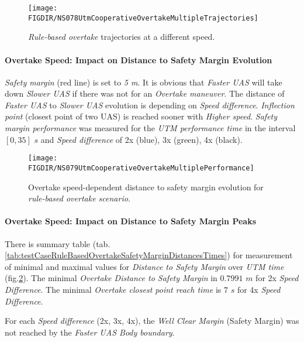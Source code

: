     \begin{figure}[H]
        \centering
        \texttt{[image: \\FIGDIR/NS078UtmCooperativeOvertakeMultipleTrajectories]}
        \caption{\emph{Rule-based overtake} trajectories at a different speed.}
        \label{fig:testCaseRuleBasedOvertakeDifferentSpeedTrajectoriesPerformance}
    \end{figure}
    \paragraph{Overtake Speed: Impact on Distance to Safety Margin Evolution} \emph{Safety margin} (red line) is set to \emph{5 m}. It is obvious that \emph{Faster UAS} will take down \emph{Slower UAS} if there was not for an \emph{Overtake maneuver}.  The distance of \emph{Faster UAS} to \emph{Slower UAS} evolution is depending on \emph{Speed difference}. \emph{Inflection point} (closest point of two UAS) is reached sooner with \emph{Higher speed}. \emph{Safety margin performance} was measured for the \emph{UTM performance time} in the interval $[0,35]$ $s$ and \emph{Speed difference} of 2x (blue), 3x (green), 4x (black).
    
    \begin{figure}[H]
        \centering
        \texttt{[image: \\FIGDIR/NS079UtmCooperativeOvertakeMultiplePerformance]}
        \caption{Overtake speed-dependent distance to safety margin evolution for \emph{rule-based overtake scenario}.}
        \label{fig:testRuleBasedOvertakeSafetyMarginForDifferentSpeedPerformance}
    \end{figure}
    
    \paragraph{Overtake Speed: Impact on Distance to Safety Margin Peaks} There is summary table (tab. \ref{tab:testCaseRuleBasedOvertakeSafetyMarginDistancesTimes}) for  measurement of minimal and maximal values for \emph{Distance to Safety Margin} over \emph{UTM time} (fig.\ref{fig:testRuleBasedOvertakeSafetyMarginForDifferentSpeedPerformance}). The minimal \emph{Overtake Distance to Safety Margin} in $0.7991$ $m$ for 2x \emph{Speed Difference}. The minimal \emph{Overtake closest point reach time} is $7$ $s$ for 4x \emph{Speed Difference}.
    
    For each \emph{Speed difference} (2x, 3x, 4x), the \emph{Well Clear Margin} (Safety Margin) was not reached by the \emph{Faster UAS Body boundary}.  
    
